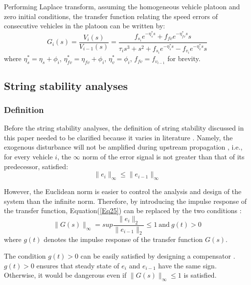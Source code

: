 \documentclass[a4paper]{cas-sc}
\begin{document}
Performing Laplace transform, assuming the homogeneous vehicle platoon and zero initial conditions, the transfer function relating the speed errors of consecutive vehicles in the platoon can be written by:
\begin{equation}
  G_i\left(s\right)=\frac{V_i\left(s\right)}{V_{i-1}\left(s\right)}=\frac{f_{s_i}e^{-\eta_s^\ast s}+f_{fv}e^{-\eta_{fv}^\ast s}s}{\tau_is^3+s^2+f_{s_i}e^{-\eta_s^\ast s}-f_{v_i}e^{-\eta_v^\ast s}s}
  \label{Eq24}
\end{equation}
where $\eta_s^\ast=\eta_s+\phi_i$, $\eta_{fv}^\ast=\eta_{fv}+\phi_i$, $\eta_v^\ast=\phi_i$, $f_{fv}=f_{v_{i-1}}$ for brevity.


\subsection{String stability analyses}
\label{Section 4.3}

\subsubsection{Definition}
\label{Section 4.3.1}

Before the string stability analyses, the definition of string stability discussed in this paper needed to be clarified because it varies in literature \citep{Wilson2008,Treiber2011,Ruan2021}. Namely, the exogenous disturbance will not be amplified during upstream propagation \citep{Montanino2021a,Qin2021,Jin2014}, i.e., for every vehicle $i$, the $\infty$ norm of the error signal is not greater than that of its predecessor, satisfied:
\begin{equation}
  \parallel {e_i}{\parallel _\infty } \leqslant \parallel {e_{i - 1}}{\parallel _\infty }
  \label{Eq25}
\end{equation}

However, the Euclidean norm is easier to control the analysis and design of the system than the infinite norm. Therefore, by introducing the impulse response of the transfer function, Equation(\ref{Eq25}) can be replaced by the two conditions \citep{Swaroop1994,Darbha1999}:
\begin{equation}
  \parallel G\left(s\right)\parallel_\infty = sup\frac{\parallel e_i\parallel_2}{\parallel e_{i-1}\parallel_2}\le1\mathrm{\ and\ }g(t)>0
  \label{Eq26}
\end{equation}
where $g(t)$ denotes the impulse response of the transfer function $G(s)$.

The condition $g(t)>0$ can be easily satisfied by designing a compensator \citep{Rajamani2011,Darbha2003}. $g(t)>0$ ensures that steady state of $e_i$ and $e_{i-1}$ have the same sign. Otherwise, it would be dangerous even if $\parallel G\left(s\right)\parallel_\infty\le1$ is satisfied.
\end{document}
